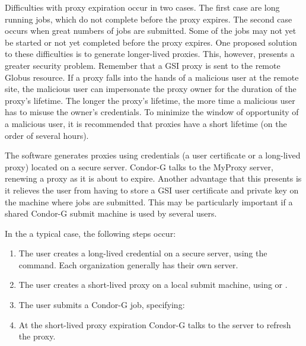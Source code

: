 Difficulties with proxy expiration occur in two cases.
The first case are long running jobs, which do not complete
before the proxy expires.
The second case occurs when great numbers of jobs are submitted.
Some of the jobs may not yet be started
or not yet completed before the proxy expires.
One proposed solution to these difficulties is to generate
longer-lived proxies.
This, however, presents a greater security problem.
Remember that a GSI proxy is sent to the remote Globus resource.
If a proxy falls into the hands of a malicious user at the remote site,
the malicious user can impersonate the proxy owner
for the duration of the proxy's lifetime.
The longer the proxy's lifetime,
the more time a malicious user has to misuse the owner's credentials.
To minimize the
window of opportunity of a
malicious user, 
it is recommended that proxies have a short lifetime
(on the order of several hours).

The  software generates proxies using credentials
(a user certificate or a long-lived proxy) located on a secure
 server.
Condor-G talks to the MyProxy server,
renewing a proxy as it is about to expire.
Another advantage that this presents is it relieves the user
from having to store a GSI user certificate and private key
on the machine where jobs are submitted.
This may be particularly important if a shared Condor-G
submit machine is used by several users.

In the a typical case, the following steps occur:

\begin{enumerate}
\item{The user creates a long-lived credential}
on a secure  server, using the
 command.
Each organization generally has their own  server.

\item{The user creates a short-lived proxy}
on a local submit machine,
using
 or .

\item{The user submits}
a Condor-G job,
specifying:

\item{At the short-lived proxy expiration}
Condor-G talks to
the  server to refresh the proxy.

\end{enumerate}


